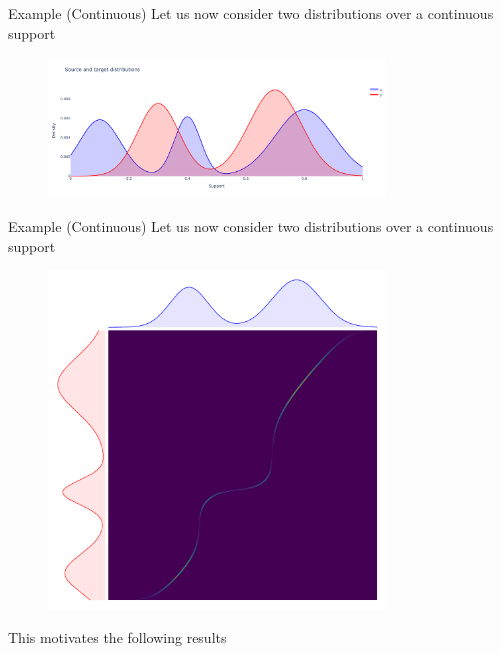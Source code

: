\documentclass[pdf,aspectratio=169,10pt]{beamer}
\begin{document}
\begin{frame}{Example (Continuous)}
    Let us now consider two  distributions over a continuous support
         \begin{figure}
        \includegraphics[width=0.8\textwidth]{../img/kantorovich_continuous_density.pdf}\hspace{2em}
    \end{figure}
\end{frame}


\begin{frame}{Example (Continuous)}
    Let us now consider two  distributions over a continuous support
    \begin{minipage}{0.6\textwidth}
        \begin{figure}
            \includegraphics[width=0.8\textwidth]{../img/kantorovich_continuous_solution.pdf}
        \end{figure}
    \end{minipage}
    \hspace{0.25em}
    \begin{minipage}{0.36\textwidth}

        This motivates the following results
    \end{minipage}
\end{frame}
\end{document}
